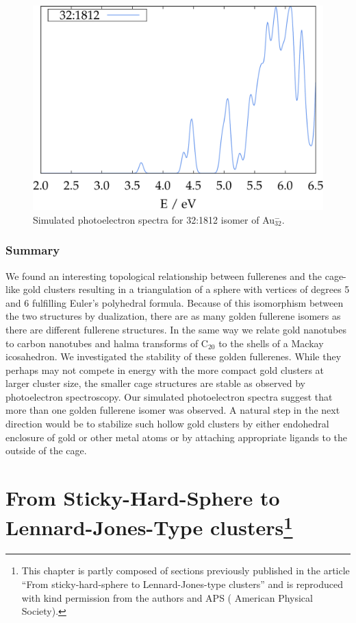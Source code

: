\begin{figure}[htbp]
\begin{center}
\includegraphics[width=.8\textwidth]{golddual/photo/Au32/nonrel/compare.pdf}
\caption{Simulated photoelectron spectra for 32:1812 isomer of Au$_{32}^-$.}
  \label{fig:photo_Au32}
\end{center}
\end{figure}


\subsection{Summary}

We found an interesting topological relationship between fullerenes and the
cage-like gold clusters resulting in a triangulation of a sphere with vertices
of degrees 5 and 6 fulfilling Euler's polyhedral formula. Because of this
isomorphism between the two structures by dualization, there are as many golden
fullerene isomers as there are different fullerene structures. In the same way
we relate gold nanotubes to carbon nanotubes and halma transforms of C$_{20}$
to the shells of a Mackay icosahedron. We investigated the stability of these
golden fullerenes. While they perhaps may not compete in energy with the more
compact gold clusters at larger cluster size, the smaller cage structures are
stable as observed by photoelectron spectroscopy. Our simulated photoelectron
spectra suggest that more than one golden fullerene isomer was observed. A
natural step in the next direction would be to stabilize such hollow gold
clusters by either endohedral enclosure of gold or other metal atoms or by
attaching appropriate ligands to the outside of the cage.

\chapter[From Sticky-Hard-Sphere to Lennard-Jones-Type clusters]{
    From Sticky-Hard-Sphere to Lennard-Jones-Type clusters\footnote{This
    chapter is partly composed of sections previously published in the article
    ``From sticky-hard-sphere to Lennard-Jones-type
    clusters''\autocite{Trombach_stickyhardsphereLennardJonestypeclusters_2018}
    and is reproduced with kind permission from the authors and APS
    ( American Physical Society).}
}
\label{sec:fromstickyhardspheretoLJtypeclusters}


